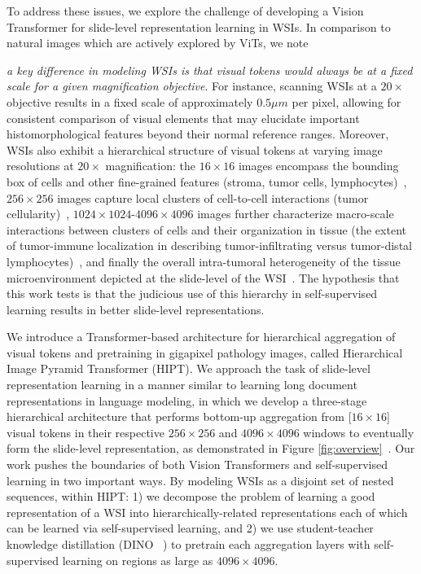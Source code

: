 To address these issues, we explore the challenge of developing a Vision Transformer for slide-level representation learning in WSIs. In comparison to natural images which are actively explored by ViTs, we note {\textit{a key difference in modeling WSIs is that visual tokens would always be at a fixed scale for a given magnification objective}. For instance, scanning WSIs at a $20\times$ objective results in a fixed scale of approximately $0.5 \mu m$ per pixel, allowing for consistent comparison of visual elements that may elucidate important histomorphological features beyond their normal reference ranges. Moreover, WSIs also exhibit a hierarchical structure of visual tokens at varying image resolutions at $20\times$ magnification: the $16 \times 16$ images encompass the bounding box of cells and other fine-grained features (stroma, tumor cells, lymphocytes)~\cite{Diao2021, hou2019sparse}, $256 \times 256$ images capture local clusters of cell-to-cell interactions (tumor cellularity)~\cite{graham2019hover, bejnordi2017diagnostic, pati2020hact, abousamra2021multi}, $1024 \times 1024$-$4096 \times 4096$ images further characterize macro-scale interactions between clusters of cells and their organization in tissue (the extent of tumor-immune localization in describing tumor-infiltrating versus tumor-distal lymphocytes)~\cite{abduljabbar2020geospatial, brancati2021bracs}, and finally the overall intra-tumoral heterogeneity of the tissue microenvironment depicted at the slide-level of the WSI~\cite{javed2020cellular,saltz2018spatial, hosseini2019atlas, balkwill2012tumor, marusyk2012intra}. The hypothesis that this work tests is that the judicious use of this hierarchy in self-supervised learning results in better slide-level representations. 

We introduce a Transformer-based architecture for hierarchical aggregation of visual tokens and pretraining in gigapixel pathology images, called Hierarchical Image Pyramid Transformer (HIPT). We approach the task of slide-level representation learning in a manner similar to learning long document representations in language modeling, in which we develop a three-stage hierarchical architecture that performs bottom-up aggregation from [$16 \times 16$] visual tokens in their respective $256 \times 256$ and $4096 \times 4096$ windows to eventually form the slide-level representation, as demonstrated in Figure \ref{fig:overview}~\cite{yang2016hierarchical, zhang-etal-2019-hibert}. Our work pushes the boundaries of both Vision Transformers and self-supervised learning in two important ways. By modeling WSIs as a disjoint set of nested sequences, within HIPT: 1) we decompose the problem of learning a good representation of a WSI into hierarchically-related representations each of which can be learned via self-supervised learning, and 2) we use student-teacher knowledge distillation (DINO ~\cite{caron2021emerging}) to pretrain each aggregation layers with self-supervised learning on regions as large as $4096 \times 4096$.

}
